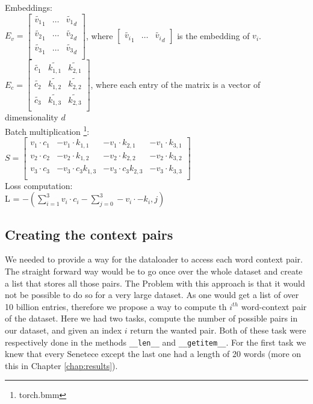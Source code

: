 Embeddings:\\
$E_v = \begin{bmatrix}
\tilde{v_1}_1 & \ldots & \tilde{v_1}_d\\
\tilde{v_2}_1 & \ldots & \tilde{v_2}_d\\
\tilde{v_3}_1 & \ldots & \tilde{v_3}_d\\
\end{bmatrix}
$, where $\begin{bmatrix}
\tilde{v_i}_1 & \ldots & \tilde{v_i}_d \end{bmatrix}$ is the embedding of $v_i$.  \\$E_c = \begin{bmatrix}
\tilde{c_1 }& \tilde{k_{1,1}} & \tilde{k_{2,1}} \\
\tilde{c_2 }& \tilde{k_{1,2}}& \tilde{k_{2,2}} \\
\tilde{c_3 }&\tilde{ k_{1,3} }& \tilde{k_{2,3}}\\
\end{bmatrix}$,
where each entry of the matrix is a vector of dimensionality $d$\\
Batch multiplication \footnote{torch.bmm}:\\
$S = \begin{bmatrix}
v_1 \cdot c_1 & -v_1 \cdot k_{1,1} & -v_1 \cdot  k_{2,1} & -v_1 \cdot  k_{3,1}\\
v_2 \cdot c_2 & -v_2 \cdot k_{1,2} & -v_2 \cdot k_{2,2} & -v_2 \cdot k_{3,2}\\
v_3 \cdot c_3 &-v_3 \cdot c_3  k_{1,3} & -v_3 \cdot c_3 k_{2,3}&-v_3 \cdot k_{3,3}\\
\end{bmatrix}$\\
Loss computation: \\
 L = $-(\sum_{i=1}^3 v_i \cdot c_i - \sum_{j=0}^3 -v_i \cdot -k_i,j)$

\subsection{Creating the context pairs}
We needed to provide a way for the dataloader to access each word context pair. The straight forward way would be to go once over the whole dataset and create a list that stores all those pairs. The Problem with this approach is that it would not be possible to do so for a very large dataset. As one would get a list of over 10 billion entries, therefore we propose a way to compute th $i^{th}$ word-context pair of the dataset. Here we had two tasks, compute the number of possible pairs in our dataset, and given an index $i$ return the wanted pair. Both of these task were respectively done in the methods \texttt{\_\_len\_\_} and \texttt{\_\_getitem\_\_}.
For the first task we knew that every Senetece except the last one had a length of 20 words (more on this in Chapter \ref{chap:results}). 
